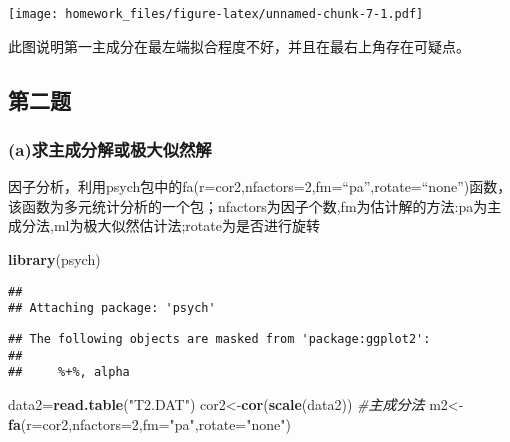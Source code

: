 \documentclass[
]{article}
\newenvironment{Shaded}{\begin{snugshade}}{\end{snugshade}}
\newcommand{\CommentTok}[1]{\textcolor[rgb]{0.56,0.35,0.01}{\textit{#1}}}
\newcommand{\DataTypeTok}[1]{\textcolor[rgb]{0.13,0.29,0.53}{#1}}
\newcommand{\DecValTok}[1]{\textcolor[rgb]{0.00,0.00,0.81}{#1}}
\newcommand{\KeywordTok}[1]{\textcolor[rgb]{0.13,0.29,0.53}{\textbf{#1}}}
\newcommand{\NormalTok}[1]{#1}
\newcommand{\OperatorTok}[1]{\textcolor[rgb]{0.81,0.36,0.00}{\textbf{#1}}}
\newcommand{\StringTok}[1]{\textcolor[rgb]{0.31,0.60,0.02}{#1}}
\begin{document}
\begin{Shaded}
\end{Shaded}

\texttt{[image: homework\_files/figure-latex/unnamed-chunk-7-1.pdf]}

此图说明第一主成分在最左端拟合程度不好，并且在最右上角存在可疑点。

\hypertarget{ux7b2cux4e8cux9898}{%
\subsection{第二题}\label{ux7b2cux4e8cux9898}}

\hypertarget{aux6c42ux4e3bux6210ux5206ux89e3ux6216ux6781ux5927ux4f3cux7136ux89e3}{%
\subsubsection{(a)求主成分解或极大似然解}\label{aux6c42ux4e3bux6210ux5206ux89e3ux6216ux6781ux5927ux4f3cux7136ux89e3}}

因子分析，利用psych包中的fa(r=cor2,nfactors=2,fm=``pa'',rotate=``none'')函数，该函数为多元统计分析的一个包；nfactors为因子个数,fm为估计解的方法:pa为主成分法,ml为极大似然估计法;rotate为是否进行旋转

\begin{Shaded}
\begin{Highlighting}[]
\KeywordTok{library}\NormalTok{(psych)}
\end{Highlighting}
\end{Shaded}

\begin{verbatim}
## 
## Attaching package: 'psych'
\end{verbatim}

\begin{verbatim}
## The following objects are masked from 'package:ggplot2':
## 
##     %+%, alpha
\end{verbatim}

\begin{Shaded}
\begin{Highlighting}[]
\NormalTok{data2=}\KeywordTok{read.table}\NormalTok{(}\StringTok{"T2.DAT"}\NormalTok{)}
\NormalTok{cor2<-}\KeywordTok{cor}\NormalTok{(}\KeywordTok{scale}\NormalTok{(data2)) }
\CommentTok{#主成分法}
\NormalTok{m2<-}\KeywordTok{fa}\NormalTok{(}\DataTypeTok{r=}\NormalTok{cor2,}\DataTypeTok{nfactors=}\DecValTok{2}\NormalTok{,}\DataTypeTok{fm=}\StringTok{"pa"}\NormalTok{,}\DataTypeTok{rotate=}\StringTok{"none"}\NormalTok{)}
\end{Highlighting}
\end{Shaded}
\end{document}
